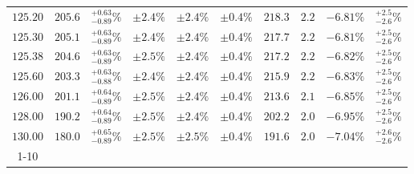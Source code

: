 \begin{table}[ht!]
{{\begin{tabular}{| cc | c | ccc | ccc | c |}
$125.20$ & $205.6$ & $^{+0.63}_{-0.89}\%$ & $\pm 2.4\%$ & {\color{black!55}$\pm 2.4\%$} & {\color{black!55}$\pm 0.4\%$} & $218.3$ & $2.2$ & $-6.81\%$ & $^{+2.5}_{-2.6}\%$ \\
$125.30$ & $205.1$ & $^{+0.63}_{-0.89}\%$ & $\pm 2.4\%$ & {\color{black!55}$\pm 2.4\%$} & {\color{black!55}$\pm 0.4\%$} & $217.7$ & $2.2$ & $-6.81\%$ & $^{+2.5}_{-2.6}\%$ \\
$125.38$ & $204.6$ & $^{+0.63}_{-0.89}\%$ & $\pm 2.5\%$ & {\color{black!55}$\pm 2.4\%$} & {\color{black!55}$\pm 0.4\%$} & $217.2$ & $2.2$ & $-6.82\%$ & $^{+2.5}_{-2.6}\%$ \\
$125.60$ & $203.3$ & $^{+0.63}_{-0.88}\%$ & $\pm 2.4\%$ & {\color{black!55}$\pm 2.4\%$} & {\color{black!55}$\pm 0.4\%$} & $215.9$ & $2.2$ & $-6.83\%$ & $^{+2.5}_{-2.6}\%$ \\
$126.00$ & $201.1$ & $^{+0.64}_{-0.89}\%$ & $\pm 2.5\%$ & {\color{black!55}$\pm 2.4\%$} & {\color{black!55}$\pm 0.4\%$} & $213.6$ & $2.1$ & $-6.85\%$ & $^{+2.5}_{-2.6}\%$ \\
$128.00$ & $190.2$ & $^{+0.64}_{-0.89}\%$ & $\pm 2.5\%$ & {\color{black!55}$\pm 2.4\%$} & {\color{black!55}$\pm 0.4\%$} & $202.2$ & $2.0$ & $-6.95\%$ & $^{+2.5}_{-2.6}\%$ \\
$130.00$ & $180.0$ & $^{+0.65}_{-0.89}\%$ & $\pm 2.5\%$ & {\color{black!55}$\pm 2.5\%$} & {\color{black!55}$\pm 0.4\%$} & $191.6$ & $2.0$ & $-7.04\%$ & $^{+2.6}_{-2.6}\%$ \\
\cline{1-10}
\end{tabular}
}
}
\end{table}

